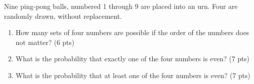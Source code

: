 
\item Nine ping-pong balls, numbered 1 through 9 are placed into an urn. Four are randomly drawn, without replacement.

\begin{enumerate}

\item How many sets of four numbers are possible if the order of the numbers does not matter? (6 pts)

\vfill

\item What is the probability that exactly one of the four numbers is even? (7 pts)

\vfill


\item What is the probability that at least one of the four numbers is even? (7 pts)

\vfill

\end{enumerate}
